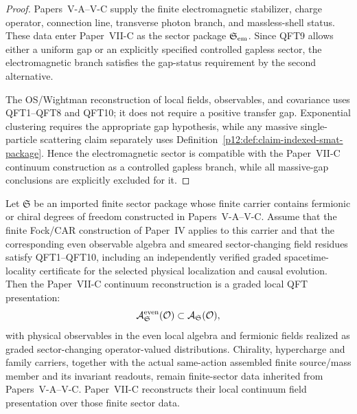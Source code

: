 \documentclass[12pt,a4paper]{article}
\begin{document}
\begin{proof}
Papers~V-A--V-C supply the finite electromagnetic stabilizer, charge operator, connection line, transverse photon branch, and massless-shell status.  These data enter Paper~VII-C as the sector package \(\mathfrak S_{\rm em}\).  Since QFT9 allows either a uniform gap or an explicitly specified controlled gapless sector, the electromagnetic branch satisfies the gap-status requirement by the second alternative.

The OS/Wightman reconstruction of local fields, observables, and covariance
uses QFT1--QFT8 and QFT10; it does not require a positive transfer gap.
Exponential clustering requires the appropriate gap hypothesis, while any
massive single-particle scattering claim separately uses
Definition~\ref{p12:def:claim-indexed-smat-package}.  Hence the electromagnetic
sector is compatible with the Paper~VII-C continuum construction as a controlled
gapless branch, while all massive-gap conclusions are explicitly excluded for
it.
\end{proof}

\begin{proposition}
\label{p12:prop:graded-chiral-sector-compatibility}
Let \(\mathfrak S\) be an imported finite sector package whose finite carrier contains fermionic or chiral degrees of freedom constructed in Papers~V-A--V-C.  Assume that the finite Fock/CAR construction of Paper~IV applies to this carrier and that the corresponding even observable algebra and smeared sector-changing field residues satisfy QFT1--QFT10, including an independently verified graded spacetime-locality certificate for the selected physical localization and causal evolution.  Then the Paper~VII-C continuum reconstruction is a graded local QFT presentation:
\[
\mathcal A_{\mathfrak S}^{\rm even}(\mathcal O)
\subset
\mathcal A_{\mathfrak S}(\mathcal O),
\]
with physical observables in the even local algebra and fermionic fields realized as graded sector-changing operator-valued distributions.  Chirality, hypercharge and family carriers, together with the actual same-action assembled finite source/mass member and its invariant readouts, remain finite-sector data inherited from Papers~V-A--V-C.  Paper~VII-C reconstructs their local continuum field presentation over those finite sector data.
\end{proposition}
\end{document}
